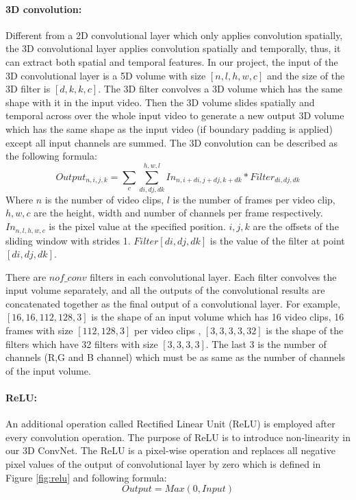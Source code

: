 \paragraph*{3D convolution:}
\label{3dconv_filters}
Different from a 2D convolutional layer which only applies convolution spatially, the 3D  convolutional layer applies convolution spatially and temporally, thus, it can extract both spatial and temporal features. In our project, the input of the 3D convolutional layer is a 5D volume with size \([n,l,h,w,c]\) and the size of the 3D filter is \([d,k,k,c]\). The 3D filter convolves a 3D volume which has the same shape with it in the input video. Then the 3D volume slides spatially and temporal across over the whole input video to generate a new output 3D volume which has the same shape as the input video (if boundary padding is applied) except all input channels are summed. The 3D convolution can be described as the following formula: 
\begin{equation}
	Output_{n,i,j,k} = \sum_c \sum_{di,dj,dk}^{h,w,l} In_{n, i + di, j + dj, k + dk} * Filter_{di,dj,dk}
\end{equation}
Where \(n\) is the number of video clips, \(l\) is the number of frames per video clip, \(h,w,c\) are the height, width and number of channels per frame respectively. \(In_{n,l,h,w,c}\) is the pixel value at the specified position. \(i,j,k\) are the offsets of the sliding window with strides 1. \(Filter[di,dj,dk]\) is the value of the filter at point \([di,dj,dk]\). 
\par 
There are \(nof\_conv\) filters in each convolutional layer. Each filter convolves the input volume separately, and all the outputs of the convolutional results are concatenated together as the final output of a convolutional layer. For example, \([16,16,112,128,3]\) is the shape of an input volume which has 16 video clips, 16 frames with size \([112,128,3]\) per video clips , \([3,3,3,3,32]\) is the shape of the filters which have 32 filters with size \([3,3,3,3]\). The last \(3\) is the number of channels (R,G and B channel) which must be as same as the number of channels of the input volume. 

\paragraph*{ReLU:}
An additional operation called Rectified Linear Unit (ReLU) is employed after every convolution operation. The purpose of ReLU is to introduce non-linearity in our 3D ConvNet. The ReLU is a pixel-wise operation and replaces all negative pixel values of the output of convolutional layer by zero which is defined in Figure \ref{fig:relu} and following formula:
\begin{equation}
Output = Max(0,Input)
\end{equation} 


